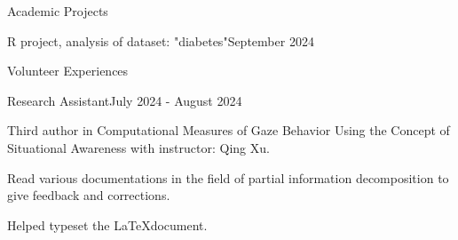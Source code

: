\documentclass[
	11pt, %
]{resume} %
\begin{document}
\begin{rSection}{Academic Projects}
\begin{rSubsection}{R project, analysis of dataset: "diabetes"}{September 2024}{}{}
	\end{rSubsection}
	

	
	


	

\end{rSection}

\begin{rSection}{Volunteer Experiences}
	\begin{rSubsection}{Research Assistant}{July 2024 - August 2024}{}{}
		\item Third author in Computational Measures of Gaze Behavior Using the Concept of Situational Awareness with instructor: Qing Xu.
		\item Read various documentations in the field of partial information decomposition to give feedback and corrections.
		\item Helped typeset the \LaTeX document.
	\end{rSubsection}
	
\end{rSection}



		
	
\end{document}
